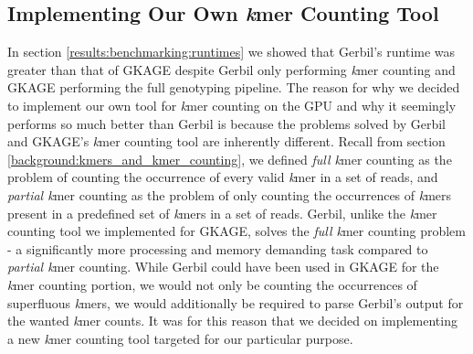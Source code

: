 \subsection{Implementing Our Own \textit{k}mer Counting Tool} \label{discussion:implementing_our_own_kmer_counting_tool}
In section \ref{results:benchmarking:runtimes} we showed that Gerbil's \cite{gerbil} runtime was greater than that of GKAGE despite Gerbil only performing \textit{k}mer counting and GKAGE performing the full genotyping pipeline.
The reason for why we decided to implement our own tool for \textit{k}mer counting on the GPU and why it seemingly performs so much better than Gerbil is because the problems solved by Gerbil and GKAGE's \textit{k}mer counting tool are inherently different.
Recall from section \ref{background:kmers_and_kmer_counting}, we defined \textit{full k}mer counting as the problem of counting the occurrence of every valid \textit{k}mer in a set of reads, and \textit{partial k}mer counting as the problem of only counting the occurrences of \textit{k}mers present in a predefined set of \textit{k}mers in a set of reads.
Gerbil, unlike the \textit{k}mer counting tool we implemented for GKAGE, solves the \textit{full k}mer counting problem - a significantly more processing and memory demanding task compared to \textit{partial k}mer counting.
While Gerbil could have been used in GKAGE for the \textit{k}mer counting portion, we would not only be counting the occurrences of superfluous \textit{k}mers, we would additionally be required to parse Gerbil's output for the wanted \textit{k}mer counts.
It was for this reason that we decided on implementing a new \textit{k}mer counting tool targeted for our particular purpose.
